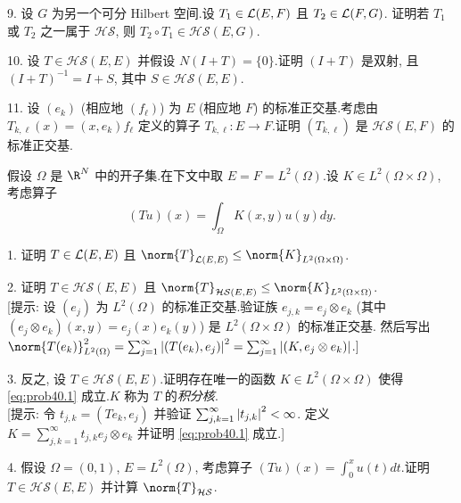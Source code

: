 \begin{problem}[第 4, 5, 6 章]
9. 设 $G$ 为另一个可分 Hilbert 空间.设 $T_1\in\mathcal{L}(E,F)$ 且 $T_2\in\mathcal{L}(F,G)$.
证明若 $T_1$ 或 $T_2$ 之一属于 $\mathcal{HS}$, 则 $T_2\circ T_1\in\mathcal{HS}(E,G)$.

10. 设 $T\in\mathcal{HS}(E,E)$ 并假设 $N(I+T)=\{0\}$.证明 $(I+T)$ 是双射, 且
$(I+T)^{-1}=I+S$, 其中 $S\in\mathcal{HS}(E,E)$.

11. 设 $(e_k)$ (相应地 $(f_\ell)$) 为 $E$ (相应地 $F$) 的标准正交基.考虑由
$T_{k,\ell}(x)=(x,e_k)f_\ell$ 定义的算子 $T_{k,\ell}:E\to F$.证明 $(T_{k,\ell})$
是 $\mathcal{HS}(E,F)$ 的标准正交基.


假设 $\Omega$ 是 $\R^N$ 中的开子集.在下文中取 $E=F=L^2(\Omega)$.设
$K\in L^2(\Omega\times\Omega)$, 考虑算子
\begin{equation}
(Tu)(x)=\int_\Omega K(x,y)u(y)dy.
\label{eq:prob40.1}
\end{equation}

1. 证明 $T\in\mathcal{L}(E,E)$ 且 $\norm{T}_{\LL(E,E)}\le\norm{K}_{L^2(\Omega\times\Omega)}$.

2. 证明 $T\in\mathcal{HS}(E,E)$ 且 $\norm{T}_{\mathcal{HS}(E,E)}\le\norm{K}_{L^2(\Omega\times\Omega)}$.\\
{[提示: 设 $(e_j)$ 为 $L^2(\Omega)$ 的标准正交基.验证族 $e_{j,k}=e_j\otimes e_k$
(其中 $(e_j\otimes e_k)(x,y)=e_j(x)e_k(y)$) 是 $L^2(\Omega\times\Omega)$ 的标准正交基.
然后写出 $\norm{T(e_k)}_{L^2(\Omega)}^2=\sum_{j=1}^\infty\abs{(T(e_k),e_j)}^2=\sum_{j=1}^\infty\abs{(K,e_j\otimes e_k)}$.]}

3. 反之, 设 $T\in\mathcal{HS}(E,E)$.证明存在唯一的函数 $K\in L^2(\Omega\times\Omega)$
使得 \eqref{eq:prob40.1} 成立.$K$ 称为 $T$ 的\emph{积分核}.\\
{[提示: 令 $t_{j,k}=(Te_k,e_j)$ 并验证 $\sum_{j,k=1}^\infty\left|t_{j,k}\right|^2<\infty$.
定义 $K=\sum_{j,k=1}^\infty t_{j,k}e_j\otimes e_k$ 并证明 \eqref{eq:prob40.1} 成立.]}

4. 假设 $\Omega=(0,1)$, $E=L^2(\Omega)$, 考虑算子 $(Tu)(x)=\int_0^xu(t)dt$.证明
$T\in\mathcal{HS}(E,E)$ 并计算 $\norm{T}_{\mathcal{HS}}$.
\end{problem}
